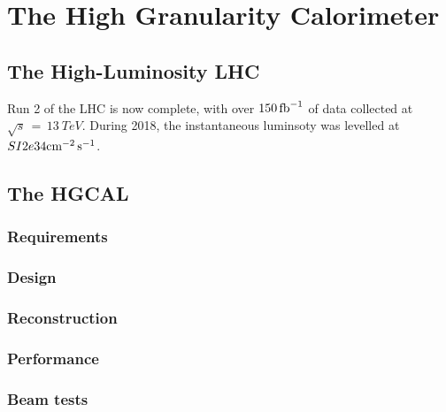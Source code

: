 \chapter{The High Granularity Calorimeter}
\label{chap:hgcal}

\section{The High-Luminosity LHC}

Run 2 of the LHC is now complete, with over $\SI{150}{\ensuremath{\textrm{fb}^{-1}}}$ of data collected at $\sqrt{s}\,=\,\SI{13}{TeV}$.
During 2018, the instantaneous luminsoty was levelled at $SI{2e34}{\textrm{cm}^{-2}\,\textrm{s}^{-1}}$. 

\section{The HGCAL}
\subsection{Requirements}
\subsection{Design}
\subsection{Reconstruction}
\subsection{Performance}
\subsection{Beam tests}
